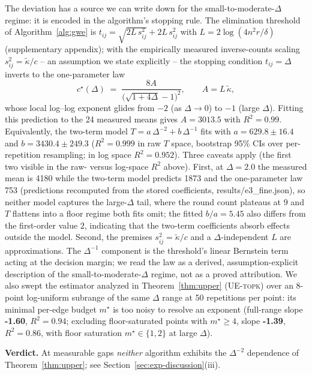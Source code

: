 \documentclass[11pt]{article}
\theoremstyle{definition}
\begin{document}
The deviation has a source we can write down for the small-to-moderate-$\Delta$ regime: it is encoded in the algorithm's stopping rule.  The elimination threshold of Algorithm~\ref{alg:gwe} is $t_{ij}=\sqrt{2L\,s_{ij}^2}+2L\,s_{ij}^2$ with $L=2\log(4n^2r/\delta)$ (supplementary appendix); with the empirically measured inverse-counts scaling $s_{ij}^2=\tilde\kappa/c$ -- an assumption we state explicitly -- the stopping condition $t_{ij}=\Delta$ inverts to the one-parameter law
\[
c^\star(\Delta)\;=\;\frac{8A}{\big(\sqrt{1+4\Delta}-1\big)^2},
\qquad A=L\,\tilde\kappa,
\]
whose local log--log exponent glides from $-2$ (as $\Delta\to0$) to $-1$ (large $\Delta$).  Fitting this prediction to the 24 measured means gives $A=3013.5$ with $R^2=0.99$.  Equivalently, the two-term model $T=a\,\Delta^{-2}+b\,\Delta^{-1}$ fits with $a=629.8\pm16.4$ and $b=3430.4\pm249.3$ ($R^2=0.999$ in raw $T$ space, bootstrap 95\% CIs over per-repetition resampling; in log space $R^2=0.952$).  Three caveats apply (the first two visible in the raw- versus log-space $R^2$ above).  First, at $\Delta=2.0$ the measured mean is 4180 while the two-term model predicts 1873 and the one-parameter law 753 (predictions recomputed from the stored coefficients, results/e3\_fine.json), so neither model captures the large-$\Delta$ tail, where the round count plateaus at 9 and $T$ flattens into a floor regime both fits omit; the fitted $b/a=5.45$ also differs from the first-order value $2$, indicating that the two-term coefficients absorb effects outside the model.  Second, the premises $s_{ij}^2=\tilde\kappa/c$ and a $\Delta$-independent $L$ are approximations.  The $\Delta^{-1}$ component is the threshold's linear Bernstein term acting at the decision margin; we read the law as a derived, assumption-explicit description of the small-to-moderate-$\Delta$ regime, not as a proved attribution.  We also swept the estimator analyzed in Theorem~\ref{thm:upper} (\textsc{UE-topk}) over an 8-point log-uniform subrange of the same $\Delta$ range at 50 repetitions per point: its minimal per-edge budget $m^\star$ is too noisy to resolve an exponent (full-range slope \textbf{-1.60}, $R^2=0.94$; excluding floor-saturated points with $m^\star\ge4$, slope \textbf{-1.39}, $R^2=0.86$, with floor saturation $m^\star\in\{1,2\}$ at large $\Delta$).

\noindent\textbf{Verdict.}  At measurable gaps \emph{neither} algorithm exhibits the $\Delta^{-2}$ dependence of Theorem~\ref{thm:upper}; see Section~\ref{sec:exp-discussion}(iii).
\end{document}
